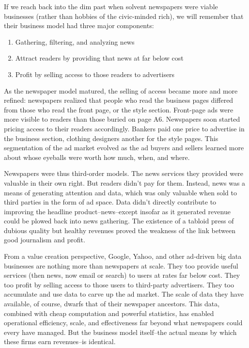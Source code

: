 \documentclass[12pt]{article}
\begin{document}
If we reach back into the dim past when solvent newspapers were viable
businesses (rather than hobbies of the civic-minded rich), we will
remember that their business model had three major components:

\begin{enumerate}
\item Gathering, filtering, and analyzing news
\item Attract readers by providing that news at far below cost
\item Profit by selling access to those readers to advertisers
\end{enumerate}

As the newspaper model matured, the selling of access became more and
more refined: newspapers realized that people who read the business
pages differed from those who read the front page, or the style
section. Front-page ads were more visible to readers than those buried
on page A6. Newspapers soon started pricing access to their readers
accordingly. Bankers paid one price to advertise in the business
section, clothing designers another for the style pages. This
segmentation of the ad market evolved as the ad buyers and sellers
learned more about whose eyeballs were worth how much, when, and
where.

Newspapers were thus third-order models. The news services they
provided were valuable in their own right. But readers didn't pay for
them. Instead, news was a means of generating attention and data,
which was only valuable when sold to third parties in the form of ad
space. Data didn't directly contribute to improving the headline
product--news--except insofar as it generated revenue could be plowed
back into news gathering. The existence of a tabloid press of dubious
quality but healthy revenues proved the weakness of the link between
good journalism and profit.

From a value creation perspective, Google, Yahoo, and other ad-driven
big data businesses are nothing more than newspapers at scale. They
too provide useful services (then news, now email or search) to users
at rates far below cost. They too profit by selling access to those
users to third-party advertisers. They too accumulate and use data to
carve up the ad market. The scale of data they have available, of
course, dwarfs that of their newspaper ancestors. This data, combined
with cheap computation and powerful statistics, has enabled
operational efficiency, scale, and effectiveness far beyond what
newspapers could every have managed. But the business model
itself--the actual means by which these firms earn revenues--is
identical.
\end{document}
